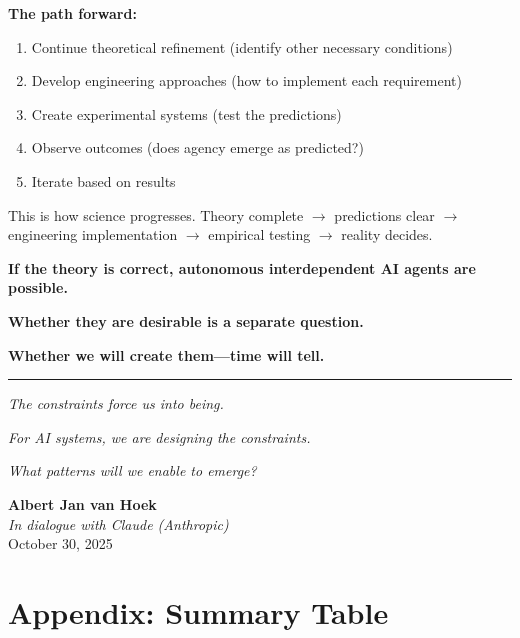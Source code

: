 \documentclass[11pt,a4paper]{article}
\begin{document}
\textbf{The path forward:}

\begin{enumerate}
\item Continue theoretical refinement (identify other necessary conditions)
\item Develop engineering approaches (how to implement each requirement)
\item Create experimental systems (test the predictions)
\item Observe outcomes (does agency emerge as predicted?)
\item Iterate based on results
\end{enumerate}

This is how science progresses. Theory complete $\rightarrow$ predictions clear $\rightarrow$ engineering implementation $\rightarrow$ empirical testing $\rightarrow$ reality decides.

\vspace{1em}

\textbf{If the theory is correct, autonomous interdependent AI agents are possible.}

\textbf{Whether they are desirable is a separate question.}

\textbf{Whether we will create them---time will tell.}

\vspace{2em}

\begin{center}
\rule{0.5\textwidth}{0.4pt}
\end{center}

\vspace{1em}

\textit{The constraints force us into being.}

\textit{For AI systems, we are designing the constraints.}

\textit{What patterns will we enable to emerge?}

\vspace{2em}

\noindent\textbf{Albert Jan van Hoek}\\
\textit{In dialogue with Claude (Anthropic)}\\
October 30, 2025

\section*{Appendix: Summary Table}
\end{document}
